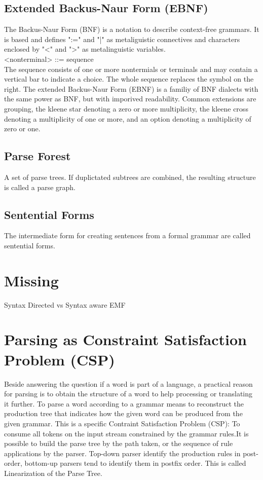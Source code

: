 \subsection{Extended Backus-Naur Form (EBNF)} 
The Backus-Naur Form (BNF) is a notation to describe context-free grammars. It is based \cite{BNF} and defines ":=" and "|" as metaliguistic connectives and characters enclosed by "<" and ">" as metalinguistic variables.\\
 <nonterminal> ::= sequence\\
The sequence consists of one or more nontermials or terminals and may contain a vertical bar to indicate a choice. The whole sequence replaces the symbol on the right. The extended Backus-Naur Form (EBNF) is a familiy of BNF dialects with the same power as BNF, but with imporived readability. Common extensions are grouping, the kleene star denoting a zero or more multiplicity, the kleene cross denoting a multiplicity of one or more, and an option denoting a multiplicity of zero or one. \cite{ParserBook}

\subsection{Parse Forest} 
A set of parse trees. If duplictated subtrees are combined, the resulting structure is called a parse graph.\cite{ParserBook}

\subsection{Sentential Forms}   
The intermediate form for creating sentences from a formal grammar are called sentential forms. \cite{ParserBook}



\section{Missing}
Syntax Directed vs Syntax aware
EMF

\section{Parsing as Constraint Satisfaction Problem (CSP)} 
Beside answering the question if a word is part of a language, a practical reason for parsing is to obtain the structure of a word to help processing or translating it further. To parse a word according to a grammar means to reconstruct the production tree that indicates how the given word can be produced from the given grammar. This is a specific Contraint Satisfaction Problem (CSP): To consume all tokens on the input stream constrained by the grammar rules.It is possible to build the parse tree by the path taken, or the sequence of rule applications by the parser.  Top-down parser identify the production rules in post-order, bottom-up parsers tend to identify them in postfix order. This is called Linearization of the Parse Tree.\cite{ParserBook}

